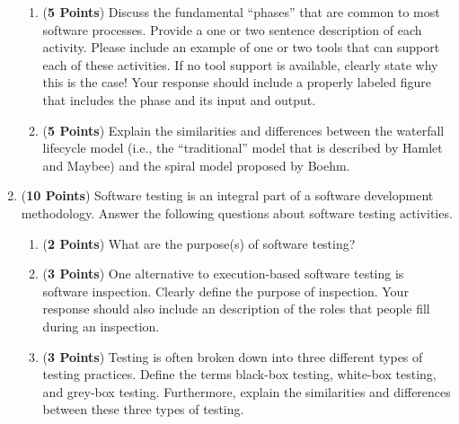 \documentclass{article}
\theoremstyle{definition}
\begin{document}
\begin{enumerate}
        \begin{enumerate}
          
        \item ({\bf 5 Points}) Discuss the fundamental ``phases'' that
          are common to most software processes.  Provide a one or two
          sentence description of each activity.  Please include an
          example of one or two tools that can support each of these
          activities. If no tool support is available, clearly state
          why this is the case!  Your response should include a
          properly labeled figure that includes the phase and its
          input and output.
          

        \item ({\bf 5 Points}) Explain the similarities and
          differences between the waterfall lifecycle model (i.e., the
          ``traditional'' model that is described by Hamlet and
          Maybee) and the spiral model proposed by Boehm.

        \end{enumerate}

\newpage

\item ({\bf 10 Points}) Software testing is an integral part of a
  software development methodology.  Answer the following questions
  about software testing activities.

  \begin{enumerate}

  \item ({\bf 2 Points}) What are the purpose(s) of software testing?
          
  \item ({\bf 3 Points}) One alternative to execution-based software
    testing is software inspection.  Clearly define the purpose of
    inspection.  Your response should also include an description of
    the roles that people fill during an inspection.

  \item ({\bf 3 Points}) Testing is often broken down into three
    different types of testing practices.  Define the terms black-box
    testing, white-box testing, and grey-box testing.  Furthermore,
    explain the similarities and differences between these three types
    of testing.
    

\end{enumerate}
\end{enumerate}
\end{document}
